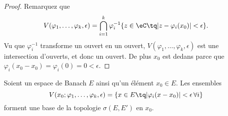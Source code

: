 \begin{proof}
	Remarquez que
	\begin{equation}
		V(\varphi_1,\ldots, \varphi_k,\epsilon)=\bigcap_{i=1}^k\varphi_i^{-1}\{ z\in \eC\tq | z-\varphi_i(x_0) | <\epsilon \}.
	\end{equation}
	Vu que \( \varphi_i^{-1}\) transforme un ouvert en un ouvert, \( V(\varphi_1,\ldots, \varphi_k,\epsilon)\) est une intersection d'ouverts, et donc un ouvert. De plus \( x_0\) est dedans parce que \( \varphi_i(x_0-x_0)=\varphi_i(0)=0 <\epsilon\).
\end{proof}

\begin{lemma}			\label{LEMooKMIEooNDdIcU}
	Soient un espace de Banach \( E\) ainsi qu'un élément \( x_0\in E\). Les ensembles
	\begin{equation}
		V(x_0;\varphi_1,\ldots, \varphi_k,\epsilon)=\{ x\in E\tq | \varphi_i(x-x_0) |<\epsilon\,\forall i \}
	\end{equation}
	forment une base de la topologie \( \sigma(E,E')\) en \( x_0\).
\end{lemma}


